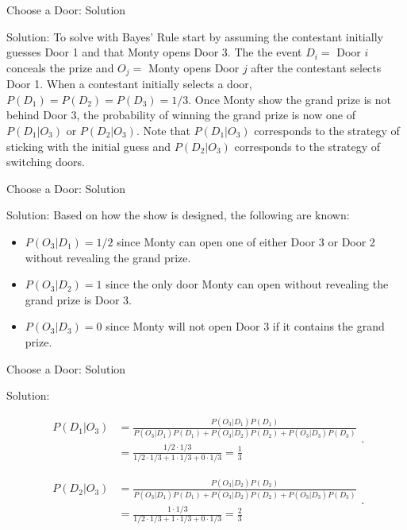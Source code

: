 \documentclass[
  ignorenonframetext,
]{beamer}
\begin{document}
\begin{frame}{Choose a Door: Solution}
\label{choose-a-door-solution}
\begin{tcolorbox}
Solution: To solve with Bayes' Rule start by assuming the contestant initially guesses Door 1 and that Monty opens Door 3. The the event $D_i=$ Door $i$ conceals the prize and
$O_j=$ Monty opens Door $j$ after the contestant selects Door 1. When a contestant initially selects a door, $P(D_1)=P(D_2)=P(D_3)=1/3$. Once Monty show the grand prize is not behind Door 3, the probability of winning the grand prize is now one of $P(D_1|O_3)$ or $P(D_2|O_3)$. Note that $P(D_1|O_3)$ corresponds to the strategy of sticking with the initial guess and $P(D_2|O_3)$ corresponds to the strategy of switching doors.
\end{tcolorbox}
\end{frame}

\begin{frame}{Choose a Door: Solution}
\label{choose-a-door-solution-1}
\begin{tcolorbox}
Solution: Based on how the show is designed, the following are known:

\begin{itemize}
\item  $P(O_3|D_1)=1/2$ since Monty can open one of either Door 3 or Door 2 without revealing the grand prize.

\item $P(O_3|D_2)=1$ since the only door Monty can open without revealing the grand prize is Door 3.

\item $P(O_3|D_3)=0$ since Monty will not open Door 3 if it contains the grand prize. 
\end{itemize}
\end{tcolorbox}
\end{frame}

\begin{frame}{Choose a Door: Solution}
\label{choose-a-door-solution-2}
\begin{tcolorbox}
Solution: 

$$\begin{array}{ll}P(D_1|O_3)&=\frac{P(O_3|D_1)P(D_1)}{P(O_3|D_1)P(D_1)+P(O_3|D_2)P(D_2)+P(O_3|D_3)P(D_3)}\\
&=\frac{1/2 \cdot 1/3}{1/2 \cdot 1/3+1\cdot 1/3+0 \cdot 1/3}=\frac{1}{3}\end{array}.$$


$$\begin{array}{ll}
P(D_2|O_3)&=\frac{P(O_3|D_2)P(D_2)}{P(O_3|D_1)P(D_1)+P(O_3|D_2)P(D_2)+P(O_3|D_3)P(D_3)}\\
&=\frac{1 \cdot 1/3}{1/2 \cdot 1/3+1\cdot 1/3+0 \cdot 1/3}=\frac{2}{3}\end{array}.$$

\end{tcolorbox}
\end{frame}
\end{document}
